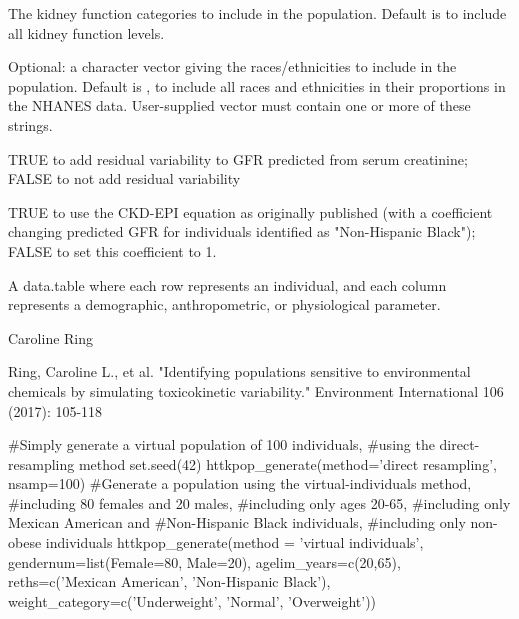 \documentclass[a4paper]{book}
\begin{document}
\begin{Arguments}
\begin{ldescription}
\item[\code{gfr\_category}] The kidney function categories to include in the
population. Default is 
to include all kidney function levels.

\item[\code{reths}] Optional: a character vector giving the races/ethnicities to
include in the population. Default is , to include
all races and ethnicities in their proportions in the NHANES data.
User-supplied vector must contain one or more of these strings.

\item[\code{gfr\_resid\_var}] TRUE to add residual variability to GFR predicted from serum creatinine; FALSE to not add residual variability

\item[\code{ckd\_epi\_race\_coeff}] TRUE to use the CKD-EPI equation as originally published (with a coefficient changing predicted GFR for individuals identified as "Non-Hispanic Black"); FALSE to set this coefficient to 1.
\end{ldescription}
\end{Arguments}
%
\begin{Value}
A data.table where each row represents an individual, and each
column represents a demographic, anthropometric, or physiological parameter.
\end{Value}
%
\begin{Author}\relax
Caroline Ring
\end{Author}
%
\begin{References}\relax
Ring, Caroline L., et al. "Identifying populations sensitive to
environmental chemicals by simulating toxicokinetic variability."
Environment International 106 (2017): 105-118
\end{References}
%
\begin{Examples}
\begin{ExampleCode}


#Simply generate a virtual population of 100 individuals,
 #using the direct-resampling method
 set.seed(42)
httkpop_generate(method='direct resampling', nsamp=100)
#Generate a population using the virtual-individuals method,
#including 80 females and 20 males,
#including only ages 20-65,
#including only Mexican American and 
 #Non-Hispanic Black individuals,
 #including only non-obese individuals
httkpop_generate(method = 'virtual individuals',
gendernum=list(Female=80, 
Male=20),
agelim_years=c(20,65), 
reths=c('Mexican American', 
'Non-Hispanic Black'),
weight_category=c('Underweight',
'Normal',
'Overweight'))




\end{ExampleCode}
\end{Examples}
\end{document}
